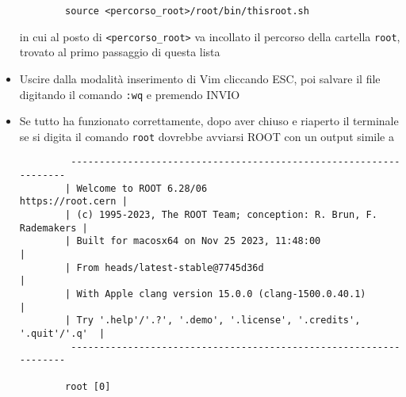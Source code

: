 \begin{itemize}
	\begin{verbatim}
		source <percorso_root>/root/bin/thisroot.sh
	\end{verbatim}
	in cui al posto di \texttt{<percorso\_root>} va incollato il percorso della cartella \texttt{root}, trovato al primo passaggio di questa lista
	\item Uscire dalla modalità inserimento di Vim cliccando ESC, poi salvare il file digitando il comando \texttt{:wq} e premendo INVIO
	\newpage
	\item Se tutto ha funzionato correttamente, dopo aver chiuso e riaperto il terminale se si digita il comando \texttt{root} dovrebbe avviarsi ROOT con un output simile a
	\begin{verbatim}
		 ------------------------------------------------------------------
		| Welcome to ROOT 6.28/06                        https://root.cern |
		| (c) 1995-2023, The ROOT Team; conception: R. Brun, F. Rademakers |
		| Built for macosx64 on Nov 25 2023, 11:48:00                      |
		| From heads/latest-stable@7745d36d                                |
		| With Apple clang version 15.0.0 (clang-1500.0.40.1)              |
		| Try '.help'/'.?', '.demo', '.license', '.credits', '.quit'/'.q'  |
		 ------------------------------------------------------------------
		
		root [0]
	\end{verbatim}
\end{itemize}